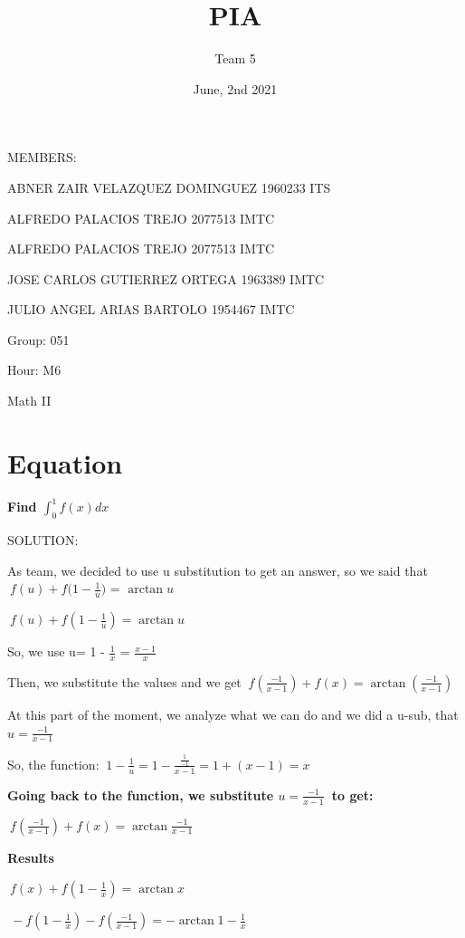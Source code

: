 \documentclass{article}
\title{PIA}
\author{Team 5}
\date{June, 2nd 2021}
\begin{document}
\maketitle
\begin{list}{}{}
       \item MEMBERS:
       \item ABNER ZAIR VELAZQUEZ DOMINGUEZ 1960233 ITS
       \item ALFREDO PALACIOS TREJO 2077513 IMTC
       \item ALFREDO PALACIOS TREJO 2077513 IMTC
       \item JOSE CARLOS GUTIERREZ ORTEGA 1963389 IMTC
       \item JULIO ANGEL ARIAS BARTOLO 1954467 IMTC
       \item Group: 051 
       \item Hour: M6 
       \item Math II
\end{list}
\newpage
\section{Equation}

\bigskip \textbf{ Find  $\int_{0}^1 f(x)dx $\ }

\bigskip SOLUTION:

\bigskip As team, we decided to use u substitution to get an answer, so we said that $\ f(u) + f({1-\frac{1}{u})}$ = $\arctan{u} $\ 

\bigskip $\ f(u)+f(1-\frac{1}{u}) =  \arctan{u} $\ 

\bigskip So, we use u= 1 - $\frac{1}{x}$ = $\frac{x-1}{x} $\

\bigskip Then, we substitute the values and we get $\ f(\frac{-1}{x-1})+f(x)=\arctan(\frac{-1}{x-1}) $\ 

\bigskip At this part of the moment, we analyze what we can do and we did a u-sub, that $u= \frac{-1}{x-1} $\

\bigskip So, the function: $\ 1-\frac{1}{u}=1-\frac{\frac{1}{-1}}{x-1} =1+(x-1)=x $\

\bigskip \textbf{Going back to the function, we substitute $u= \frac{-1}{x-1} $\ to get:}

\bigskip $\ f(\frac{-1}{x-1})+f(x)=\arctan\frac{-1}{x-1}$

\bigskip \textbf{Results}

\bigskip $\ f(x)+f(1-\frac{1}{x})=\arctan{x} $\

\bigskip $\ -f(1-\frac{1}{x})-f(\frac{-1}{x-1})=-\arctan{1-\frac{1}{x}}$
\end{document}
